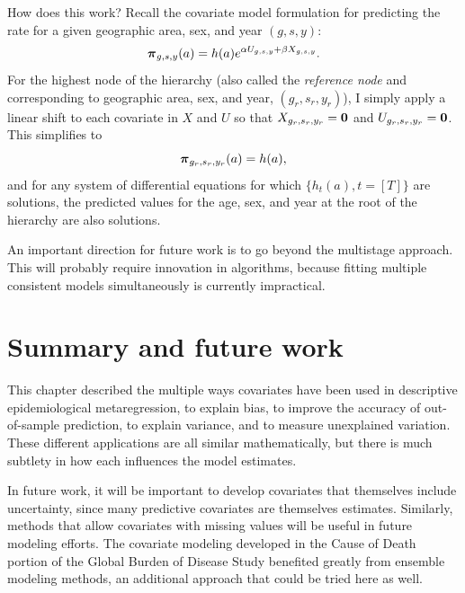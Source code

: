 How does this work?  Recall the covariate model formulation for
predicting the rate for a given geographic area, sex, and year $(g,s,y)$:
\[
{\boldsymbol{\pi}}_{g,s,y}(a) = h(a)e^{\alpha U_{g,s,y} + \beta X_{g,s,y}}.
\]
For the highest node of the hierarchy (also called the
\emph{reference node} and corresponding to geographic area, sex, and year, $(g_r, s_r,
y_r)$), I simply apply a linear shift to each covariate in $X$ and $U$
so that $X_{{g_r},{s_r},{y_r}} = \mathbf{0}$ and $U_{g_r,s_r,y_r} = \mathbf{0}$.  This
simplifies to \[ {\boldsymbol{\pi}}_{g_r,s_r,y_r}(a) = h(a), \] and for any system
of differential equations for which $\{h_t(a), t=[T]\}$ are
solutions, the predicted values for the age, sex, and year at the root of
the hierarchy are also solutions.

An important direction for future work is to go beyond the multistage
approach.  This will probably require innovation in algorithms,
because fitting multiple consistent models simultaneously is currently
impractical.


\section{Summary and future work}
This chapter described the multiple ways covariates have been used in
descriptive epidemiological metaregression, to explain bias, to
improve the accuracy of out-of-sample prediction, to explain variance,
and to measure unexplained variation.  These different applications
are all similar mathematically, but there is much subtlety in how each
influences the model estimates.

In future work, it will be important to develop covariates that
themselves include uncertainty, since many predictive covariates are
themselves estimates.  Similarly, methods that allow covariates with
missing values will be useful in future modeling efforts.  The
covariate modeling developed in the Cause of Death portion of the
Global Burden of Disease Study benefited greatly from ensemble
modeling methods,\cite{foreman_modeling_2012} an additional approach
that could be tried here as well.
